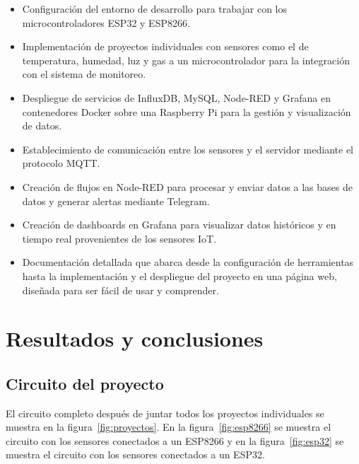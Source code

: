 \begin{itemize}
    \item Configuración del entorno de desarrollo para trabajar con los microcontroladores ESP32 y ESP8266.
    \item Implementación de proyectos individuales con sensores como el de temperatura, humedad, luz y gas a un microcontrolador para la integración con el sistema de monitoreo.
    \item Despliegue de servicios de InfluxDB, MySQL, Node-RED y Grafana en contenedores Docker sobre una Raspberry Pi para la gestión y visualización de datos.
    \item Establecimiento de comunicación entre los sensores y el servidor mediante el protocolo MQTT.
    \item Creación de flujos en Node-RED para procesar y enviar datos a las bases de datos y generar alertas mediante Telegram.
    \item Creación de dashboards en Grafana para visualizar datos históricos y en tiempo real provenientes de los sensores IoT.
    \item Documentación detallada que abarca desde la configuración de herramientas hasta la implementación y el despliegue del proyecto en una página web, diseñada para ser fácil de usar y comprender.
\end{itemize}

\section{Resultados y conclusiones}

\subsection*{Circuito del proyecto}

El circuito completo después de juntar todos los proyectos individuales se muestra en la figura~\ref{fig:proyectos}. En la figura~\ref{fig:esp8266} se muestra el circuito con los sensores conectados a un ESP8266 y en la figura~\ref{fig:esp32} se muestra el circuito con los sensores conectados a un ESP32.


